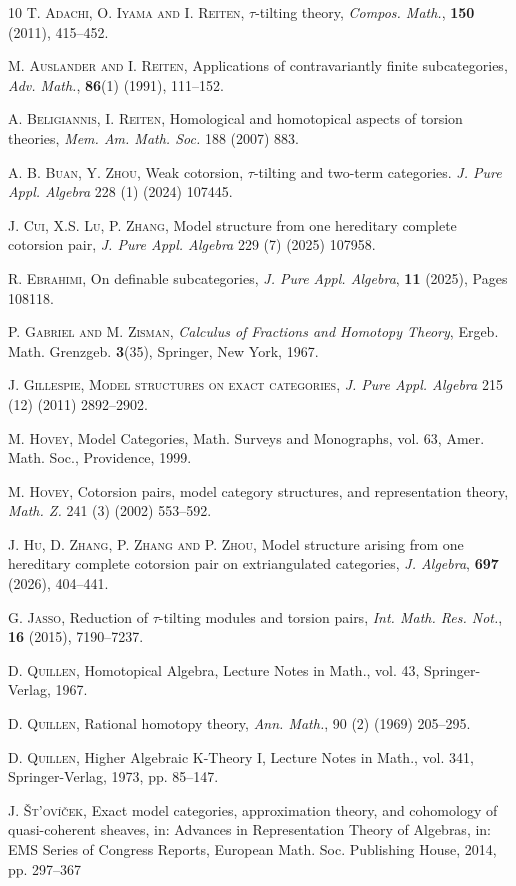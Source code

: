 \documentclass[12pt]{amsart}
\numberwithin{equation}{section}
\theoremstyle{definition}
\newtheorem*{theorem 0*}{Theorem}
\newtheorem*{theorem a*}{Theorem A}
\newtheorem*{theorem b*}{Theorem B}
\numberwithin{diagram}{section}
\begin{document}
\begin{thebibliography}{10} 
 \textsc{T. Adachi, O. Iyama and I. Reiten}, $\tau$-tilting theory, \emph{Compos. Math.}, \textbf{150} (2011), 415--452.

 \textsc{M. Auslander and I. Reiten}, Applications of contravariantly finite subcategories, \emph{Adv. Math.}, \textbf{86}(1) (1991), 111--152.

 \textsc{A. Beligiannis, I. Reiten}, Homological and homotopical aspects of torsion theories, \emph{Mem. Am. Math. Soc.} 188 (2007) 883.

 \textsc{A. B. Buan, Y. Zhou}, Weak cotorsion, $\tau$-tilting and two-term categories. \emph{J. Pure Appl. Algebra} 228 (1) (2024) 107445.

 \textsc{J. Cui, X.S. Lu, P. Zhang}, Model structure from one hereditary complete cotorsion pair, \emph{J. Pure Appl. Algebra} 229 (7) (2025) 107958. 

 \textsc{R. Ebrahimi}, On definable subcategories, \emph{J. Pure Appl. Algebra}, \textbf{11} (2025), Pages 108118.

 \textsc{P. Gabriel and M. Zisman}, \emph{Calculus of Fractions and Homotopy Theory}, Ergeb. Math. Grenzgeb. \textbf{3}(35), Springer, New York, 1967.

 \textsc{J. Gillespie, Model structures on exact categories}, \emph{J. Pure Appl. Algebra} 215 (12) (2011) 2892--2902. 

 \textsc{M. Hovey}, Model Categories, Math. Surveys and Monographs, vol. 63, Amer. Math. Soc., Providence, 1999. 
			
 \textsc{M. Hovey}, Cotorsion pairs, model category structures, and representation theory, \emph{Math. Z.} 241 (3) (2002) 553--592. 

 \textsc{J. Hu, D. Zhang, P. Zhang and P. Zhou}, Model structure arising from one hereditary complete cotorsion pair on extriangulated categories, \emph{J. Algebra}, \textbf{697} (2026), 404--441.

 \textsc{G. Jasso}, Reduction of $\tau$-tilting modules and torsion pairs, \emph{Int. Math. Res. Not.}, \textbf{16} (2015), 7190–7237.
		
 \textsc{D. Quillen}, Homotopical Algebra, Lecture Notes in Math., vol. 43, Springer-Verlag, 1967. 
			
 \textsc{D. Quillen}, Rational homotopy theory, \emph{Ann. Math.}, 90 (2) (1969) 205--295. 

 \textsc{D. Quillen}, Higher Algebraic K-Theory I, Lecture Notes in Math., vol. 341, Springer-Verlag, 1973, pp. 85--147. 

 \textsc{J. Št’ovíček}, Exact model categories, approximation theory, and cohomology of quasi-coherent sheaves, in: Advances in
Representation Theory of Algebras, in: EMS Series of Congress Reports, European Math. Soc. Publishing House, 2014,
pp. 297--367
\end{thebibliography}
	
\end{document}
